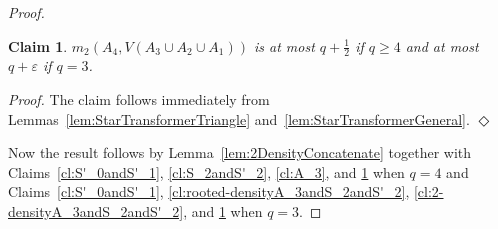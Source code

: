 \documentclass[11pt]{article}
\numberwithin{equation}{section}
\newcommand{\eps}{\varepsilon}
\newcounter{i}
\theoremstyle{plain}
\newtheorem{claim}{Claim}[thm]
\newenvironment{proofclaim}[1][]%
{\noindent \emph{Proof.} {}{#1}{}}{\hfill
	$\Diamond$\vspace{1em}}
\theoremstyle{plain} %
\theoremstyle{definition}
\begin{document}
\begin{proof}
\begin{claim}\label{cl:A_4}
    $m_2(A_4, V(A_3 \cup A_2 \cup A_1))$ is at most $q + \frac{1}{2}$ if $q \geq 4$ and at most $q + \eps$ if $q = 3$.
\end{claim}
\begin{proofclaim}
    The claim follows immediately from Lemmas~\ref{lem:StarTransformerTriangle} and~\ref{lem:StarTransformerGeneral}.
\end{proofclaim}

Now the result follows by Lemma~\ref{lem:2DensityConcatenate} together with Claims~\ref{cl:S'_0andS'_1}, \ref{cl:S_2andS'_2}, \ref{cl:A_3}, and \ref{cl:A_4} when $q = 4$ and Claims~\ref{cl:S'_0andS'_1}, \ref{cl:rooted-densityA_3andS_2andS'_2}, \ref{cl:2-densityA_3andS_2andS'_2}, and \ref{cl:A_4} when $q = 3$.

\end{proof}
\end{document}

